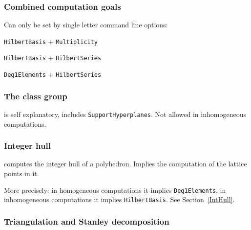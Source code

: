 \subsubsection{Combined computation goals}

Can only be set by single letter command line options:

\begin{itemize}
	\itemtt[-n] \verb|HilbertBasis| + \verb|Multiplicity|
	
	\itemtt[-h] \verb|HilbertBasis| + \verb|HilbertSeries|
	
	\itemtt[-p] \verb|Deg1Elements| + \verb|HilbertSeries|
	
\end{itemize}

\subsubsection{The class group}

\begin{itemize}
	\itemtt [ClassGroup, -C] is self explanatory, includes \verb|SupportHyperplanes|. Not allowed in inhomogeneous computations.
\end{itemize}

\subsubsection{Integer hull}

\begin{itemize}
	\itemtt [IntegerHull, -H] computes the integer hull of a polyhedron. Implies the computation of the lattice points in it.
\end{itemize}

More precisely: in homogeneous computations it implies \verb|Deg1Elements|, in inhomogeneous computations it implies \verb|HilbertBasis|. See Section~\ref{IntHull}.

\subsubsection{Triangulation and Stanley decomposition}

